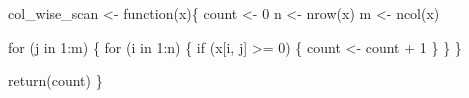 \documentclass[
  letterpaper,
  DIV=11,
  numbers=noendperiod]{scrartcl}
\newenvironment{Shaded}{\begin{snugshade}}{\end{snugshade}}
\newcommand{\ControlFlowTok}[1]{\textcolor[rgb]{0.00,0.23,0.31}{#1}}
\newcommand{\DecValTok}[1]{\textcolor[rgb]{0.68,0.00,0.00}{#1}}
\newcommand{\FunctionTok}[1]{\textcolor[rgb]{0.28,0.35,0.67}{#1}}
\newcommand{\NormalTok}[1]{\textcolor[rgb]{0.00,0.23,0.31}{#1}}
\newcommand{\OtherTok}[1]{\textcolor[rgb]{0.00,0.23,0.31}{#1}}
\newcommand{\SpecialCharTok}[1]{\textcolor[rgb]{0.37,0.37,0.37}{#1}}
\begin{document}
\begin{Shaded}
\begin{Highlighting}[]
\NormalTok{col\_wise\_scan }\OtherTok{\textless{}{-}} \ControlFlowTok{function}\NormalTok{(x)\{}
\NormalTok{    count }\OtherTok{\textless{}{-}} \DecValTok{0}
\NormalTok{    n }\OtherTok{\textless{}{-}} \FunctionTok{nrow}\NormalTok{(x)}
\NormalTok{    m }\OtherTok{\textless{}{-}} \FunctionTok{ncol}\NormalTok{(x)}

    \ControlFlowTok{for}\NormalTok{ (j }\ControlFlowTok{in} \DecValTok{1}\SpecialCharTok{:}\NormalTok{m) \{}
        \ControlFlowTok{for}\NormalTok{ (i }\ControlFlowTok{in} \DecValTok{1}\SpecialCharTok{:}\NormalTok{n) \{}
            \ControlFlowTok{if}\NormalTok{ (x[i, j] }\SpecialCharTok{\textgreater{}=} \DecValTok{0}\NormalTok{) \{}
\NormalTok{                count }\OtherTok{\textless{}{-}}\NormalTok{ count }\SpecialCharTok{+} \DecValTok{1} 
\NormalTok{            \}}
\NormalTok{        \}}
\NormalTok{    \}}

    \FunctionTok{return}\NormalTok{(count)}
\NormalTok{\}}
\end{Highlighting}
\end{Shaded}
\end{document}
